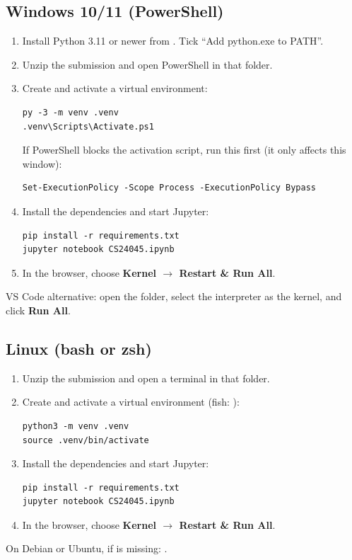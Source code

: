 \subsection{Windows 10/11 (PowerShell)}
\begin{enumerate}[itemsep=2pt]
\item Install Python 3.11 or newer from . Tick ``Add python.exe to PATH''.
\item Unzip the submission and open PowerShell in that folder.
\item Create and activate a virtual environment:
\begin{Verbatim}[frame=single,fontsize=\small]
py -3 -m venv .venv
.venv\Scripts\Activate.ps1
\end{Verbatim}
If PowerShell blocks the activation script, run this first (it only affects this window):
\begin{Verbatim}[frame=single,fontsize=\small]
Set-ExecutionPolicy -Scope Process -ExecutionPolicy Bypass
\end{Verbatim}
\item Install the dependencies and start Jupyter:
\begin{Verbatim}[frame=single,fontsize=\small]
pip install -r requirements.txt
jupyter notebook CS24045.ipynb
\end{Verbatim}
\item In the browser, choose \textbf{Kernel $\rightarrow$ Restart \& Run All}.
\end{enumerate}
VS Code alternative: open the folder, select the  interpreter as the kernel, and click
\textbf{Run All}.

\newpage
\subsection{Linux (bash or zsh)}
\begin{enumerate}[itemsep=2pt]
\item Unzip the submission and open a terminal in that folder.
\item Create and activate a virtual environment (fish: ):
\begin{Verbatim}[frame=single,fontsize=\small]
python3 -m venv .venv
source .venv/bin/activate
\end{Verbatim}
\item Install the dependencies and start Jupyter:
\begin{Verbatim}[frame=single,fontsize=\small]
pip install -r requirements.txt
jupyter notebook CS24045.ipynb
\end{Verbatim}
\item In the browser, choose \textbf{Kernel $\rightarrow$ Restart \& Run All}.
\end{enumerate}
On Debian or Ubuntu, if  is missing: .

